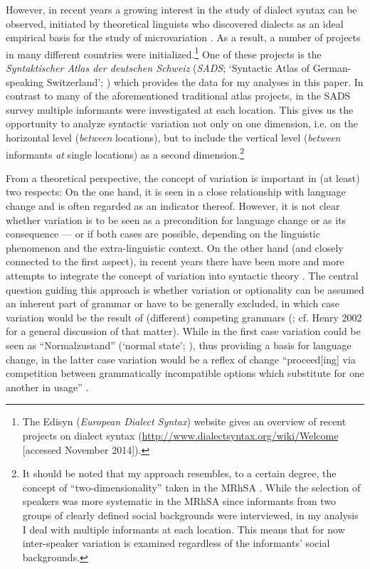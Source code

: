 \documentclass[output=paper]{LSP/langsci}
\begin{document}
However, in recent years a growing interest in the study of dialect syntax can be observed, initiated by theoretical linguists who discovered dialects as an ideal empirical basis for the study of microvariation \citep{kayne_microparametric_1996}. As a result, a number of projects in many different countries were initialized.\footnote{ The Edisyn (\emph{European Dialect Syntax}) website gives an overview of recent projects on dialect syntax (\url{http://www.dialectsyntax.org/wiki/Welcome} [accessed November 2014]).} One of these projects is the \emph{Syntaktischer Atlas der deutschen Schweiz} (\emph{SADS}; ‘Syntactic Atlas of German-speaking Switzerland’; \citealt{bucheli_syntactic_2002}) which provides the data for my analyses in this paper. In contrast to many of the aforementioned traditional atlas projects, in the SADS survey multiple informants were investigated at each location. This gives us the opportunity to analyze syntactic variation not only on one dimension, i.e. on the horizontal level (\emph{between} locations), but to include the vertical level (\emph{between} informants \emph{at} single locations) as a second dimension.\footnote{It should be noted that my approach resembles, to a certain degree, the concept of “two-dimensionality” taken in the MRhSA \citep{bellmann_zur_1997}. While the selection of speakers was more systematic in the MRhSA since informants from two groups of clearly defined social backgrounds were interviewed, in my analysis I deal with multiple informants at each location. This means that for now inter-speaker variation is examined regardless of the informants’ social backgrounds.} 

From a theoretical perspective, the concept of variation is important in (at least) two respects: On the one hand, it is seen in a close relationship with language change and is often regarded as an indicator thereof. However, it is not clear whether variation is to be seen as a precondition for language change or as its consequence \citep[39--40]{glaser_wandel_2014} --- or if both cases are possible, depending on the linguistic phenomenon and the extra-linguistic context. On the other hand (and closely connected to the first aspect), in recent years there have been more and more attempts to integrate the concept of variation into syntactic theory \citep{cornips_syntax_2005}. The central question guiding this approach is whether variation or optionality can be assumed an inherent part of grammar \citep{seiler_syntaxgeographie_2008} or have to be generally excluded, in which case variation would be the result of (different) competing grammars (\citealt{kroch_morphosyntactic_1994}; cf. Henry 2002 %
for a general discussion of that matter). While in the first case variation could be seen as “Normalzustand” (‘normal state’; \citealt[56]{seiler_syntaxgeographie_2008}), thus providing a basis for language change, in the latter case variation would be a reflex of change “proceed[ing] via competition between grammatically incompatible options which substitute for one another in usage” \citep[180]{kroch_morphosyntactic_1994}.
\end{document}
